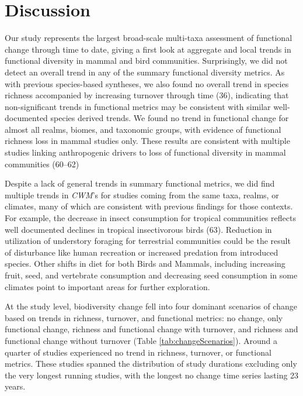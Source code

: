 \documentclass{article}
\begin{document}
\hypertarget{discussion}{%
\section{Discussion}\label{discussion}}

Our study represents the largest broad-scale multi-taxa assessment of
functional change through time to date, giving a first look at aggregate
and local trends in functional diversity in mammal and bird communities.
Surprisingly, we did not detect an overall trend in any of the summary
functional diversity metrics. As with previous species-based syntheses,
we also found no overall trend in species richness accompanied by
increasing turnover through time (36), indicating that non-significant
trends in functional metrics may be consistent with similar
well-documented species derived trends. We found no trend in functional
change for almost all realms, biomes, and taxonomic groups, with
evidence of functional richness loss in mammal studies only. These
results are consistent with multiple studies linking anthropogenic
drivers to loss of functional diversity in mammal communities (60--62)

Despite a lack of general trends in summary functional metrics, we did
find multiple trends in \emph{CWM}'s for studies coming from the same
taxa, realms, or climates, many of which are consistent with previous
findings for those contexts. For example, the decrease in insect
consumption for tropical communities reflects well documented declines
in tropical insectivorous birds (63). Reduction in utilization of
understory foraging for terrestrial communities could be the result of
disturbance like human recreation or increased predation from introduced
species. Other shifts in diet for both Birds and Mammals, including
increasing fruit, seed, and vertebrate consumption and decreasing seed
consumption in some climates point to important areas for further
exploration.

At the study level, biodiversity change fell into four dominant
scenarios of change based on trends in richness, turnover, and
functional metrics: no change, only functional change, richness and
functional change with turnover, and richness and functional change
without turnover (Table \ref{tab:changeScenarios}). Around a quarter of
studies experienced no trend in richness, turnover, or functional
metrics. These studies spanned the distribution of study durations
excluding only the very longest running studies, with the longest no
change time series lasting 23 years.
\end{document}
